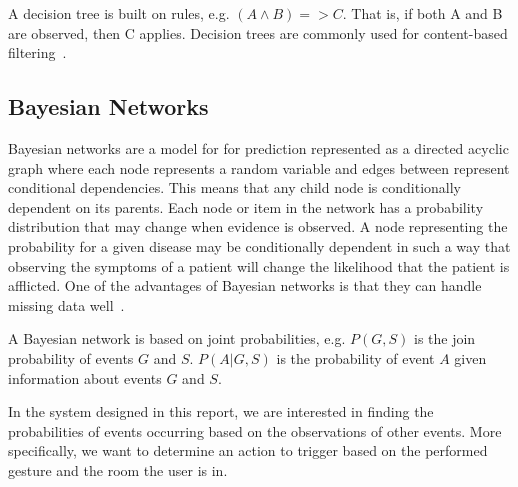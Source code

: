A decision tree is built on rules, e.g. $(A \wedge B) => C$. That is, if both A and B are observed, then C applies. Decision trees are commonly used for content-based filtering~\cite{adomavicius2005toward}.

\subsection{Bayesian Networks}
\label{sec:analysis:recommender-methods:bayesian-networks}

Bayesian networks are a model for for prediction represented as a directed acyclic graph where each node represents a random variable and edges between represent conditional dependencies.
This means that any child node is conditionally dependent on its parents.
Each node or item in the network has a probability distribution that may change when evidence is observed.
A node representing the probability for a given disease may be conditionally dependent in such a way that observing the symptoms of a patient will change the likelihood that the patient is afflicted.
One of the advantages of Bayesian networks is that they can handle missing data well~\cite{heckerman2008tutorial}. 

A Bayesian network is based on joint probabilities, e.g. $P(G,S)$ is the join probability of events $G$ and $S$. $P(A|G,S)$ is the probability of event $A$ given information about events $G$ and $S$.

In the system designed in this report, we are interested in finding the probabilities of events occurring based on the observations of other events. More specifically, we want to determine an action to trigger based on the performed gesture and the room the user is in.


